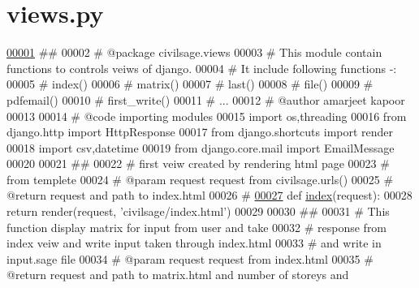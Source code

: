 \hypertarget{views_8py_source}{}\section{views.\+py}
\label{views_8py_source}

\begin{DoxyCode}
\hypertarget{views_8py_source_l00001}{}\hyperlink{namespacecivilsage_1_1views}{00001} \textcolor{comment}{##}
00002 \textcolor{comment}{# @package civilsage.views}
00003 \textcolor{comment}{# This module contain functions to controls veiws of django.}
00004 \textcolor{comment}{# It include following functions -:}
00005 \textcolor{comment}{# index()}
00006 \textcolor{comment}{# matrix() }
00007 \textcolor{comment}{# last()}
00008 \textcolor{comment}{# file() }
00009 \textcolor{comment}{# pdfemail()}
00010 \textcolor{comment}{# first\_write()}
00011 \textcolor{comment}{# ...}
00012 \textcolor{comment}{# @author amarjeet kapoor}
00013 
00014 \textcolor{comment}{# @code importing modules}
00015 \textcolor{keyword}{import} os,threading
00016 \textcolor{keyword}{from} django.http \textcolor{keyword}{import} HttpResponse
00017 \textcolor{keyword}{from} django.shortcuts \textcolor{keyword}{import} render
00018 \textcolor{keyword}{import} csv,datetime
00019 \textcolor{keyword}{from} django.core.mail \textcolor{keyword}{import} EmailMessage
00020 
00021 \textcolor{comment}{##}
00022 \textcolor{comment}{# first veiw created by rendering html page}
00023 \textcolor{comment}{# from templete}
00024 \textcolor{comment}{# @param request request from civilsage.urls()}
00025 \textcolor{comment}{# @return request and path to index.html}
00026 \textcolor{comment}{#}
\hypertarget{views_8py_source_l00027}{}\hyperlink{namespacecivilsage_1_1views_a7b4fd4478a312ce8e35a192159c59de9}{00027} \textcolor{keyword}{def }\hyperlink{namespacecivilsage_1_1views_a7b4fd4478a312ce8e35a192159c59de9}{index}(request):
00028     \textcolor{keywordflow}{return} render(request, \textcolor{stringliteral}{'civilsage/index.html'})
00029 
00030 \textcolor{comment}{##}
00031 \textcolor{comment}{# This function display matrix for input from user and take }
00032 \textcolor{comment}{# response from index veiw and write input taken through index.html}
00033 \textcolor{comment}{# and write in input.sage file}
00034 \textcolor{comment}{# @param request request from index.html}
00035 \textcolor{comment}{# @return request and path to matrix.html and number of storeys and }

\end{DoxyCode}
